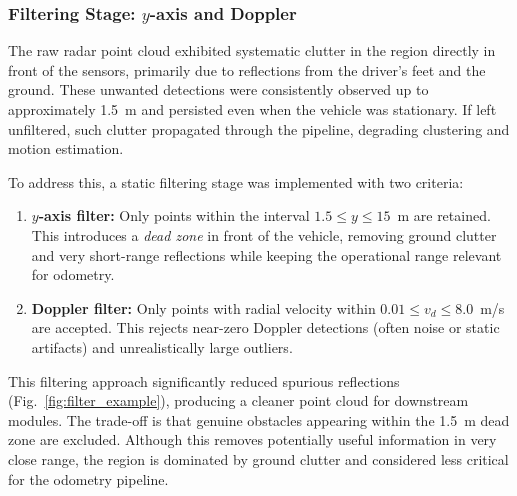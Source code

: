 \vspace{0.5em}
\subsubsection{Filtering Stage: $y$-axis and Doppler}

The raw radar point cloud exhibited systematic clutter in the region directly in front of the sensors, primarily due to reflections from the driver's feet and the ground.  
These unwanted detections were consistently observed up to approximately \SI{1.5}{\meter} and persisted even when the vehicle was stationary.  
If left unfiltered, such clutter propagated through the pipeline, degrading clustering and motion estimation.  

To address this, a static filtering stage was implemented with two criteria:
\begin{enumerate}
    \item \textbf{$y$-axis filter:} Only points within the interval $1.5 \leq y \leq 15$~m are retained.  
    This introduces a \textit{dead zone} in front of the vehicle, removing ground clutter and very short-range reflections while keeping the operational range relevant for odometry.
    \item \textbf{Doppler filter:} Only points with radial velocity within $0.01 \leq v_d \leq 8.0$~m/s are accepted.  
    This rejects near-zero Doppler detections (often noise or static artifacts) and unrealistically large outliers.
\end{enumerate}

\noindent
This filtering approach significantly reduced spurious reflections (Fig.~\ref{fig:filter_example}), producing a cleaner point cloud for downstream modules.  
The trade-off is that genuine obstacles appearing within the \SI{1.5}{\meter} dead zone are excluded.  
Although this removes potentially useful information in very close range, the region is dominated by ground clutter and considered less critical for the odometry pipeline.  

